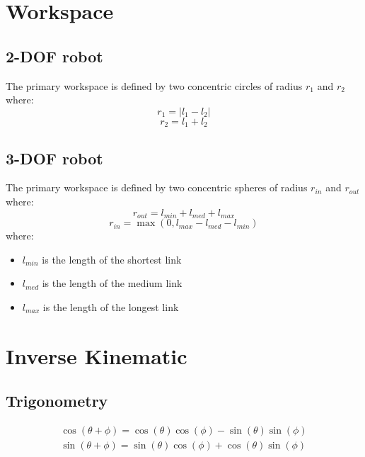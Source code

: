 \documentclass[11pt]{article}
\begin{document}
 \section{Workspace}
\subsection{2-DOF robot}
The primary workspace is defined by two concentric circles of radius $r_1$ and $r_2$ where:
\begin{equation}
r_1 = |l_1 - l_2|
\end{equation}
\begin{equation}
r_2 = l_1 + l_2
\end{equation}
\subsection{3-DOF robot}
The primary workspace is defined by two concentric spheres of radius $r_{in}$ and $r_{out}$ where:
\begin{equation}
r_{out}= l_{min}+l_{med}+l_{max}
\end{equation}
\begin{equation}
r_{in} = \max(0,l_{max}- l_{med} -l_{min})
\end{equation}
where:
\begin{itemize}
\item $l_{min}$ is the length of the shortest link
\item $l_{med}$ is the length of the medium link
\item $l_{max}$ is the length of the longest link
\end{itemize}
\section{Inverse Kinematic}
\subsection{Trigonometry}
\begin{align}
    \cos(\theta+\phi) = \cos(\theta)\cos(\phi)-\sin(\theta)\sin(\phi) \\
    \sin(\theta+\phi) = \sin(\theta)\cos(\phi)+\cos(\theta)\sin(\phi)
\end{align}
\end{document}
